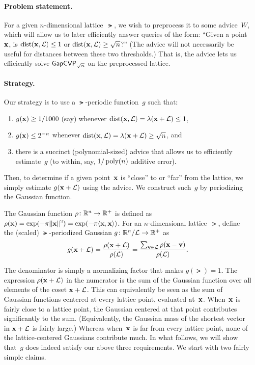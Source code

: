 \documentclass[11pt]{article}
\begin{document}
\paragraph{Problem statement.}

For a given $n$-dimensional lattice~$\lat$, we wish to preprocess it
to some advice~$W$, which will allow us to later efficiently answer
queries of the form: ``Given a point $\mathbf{x}$, is
$\operatorname{dist}(\mathbf{x},\mathcal{L}) \leq 1$ or $\operatorname{dist}(\mathbf{x},\mathcal{L}) \geq \sqrt{n}$?''
(The advice will not necessarily be useful for distances between these
two thresholds.) That is, the advice lets us efficiently solve
$\mathsf{GapCVP}_{\sqrt{n}}$ on the preprocessed lattice.

\paragraph{Strategy.}

Our strategy is to use a $\lat$-periodic function~$g$ such that:
\begin{enumerate}
\item $g(\mathbf{x}) \geq 1/1000$ (say) whenever
  $\operatorname{dist}(\mathbf{x},\mathcal{L}) = \lambda(\mathbf{x}+\mathcal{L}) \leq 1$,
\item $g(\mathbf{x}) \leq 2^{-n}$ whenever
  $\operatorname{dist}(\mathbf{x},\mathcal{L}) = \lambda(\mathbf{x}+\mathcal{L}) \geq \sqrt{n}$, and
\item there is a succinct (polynomial-sized) advice that allows us to
  efficiently estimate~$g$ (to within, say, $1/\operatorname{poly}(n)$ additive
  error).
\end{enumerate}
Then, to determine if a given point~$\mathbf{x}$ is ``close'' to or ``far''
from the lattice, we simply estimate $g(\mathbf{x}+\mathcal{L})$ using the advice.
We construct such~$g$ by periodizing the Gaussian function.

\begin{definition}
  \label{def:gaussian}
  The Gaussian function $\rho \colon \mathbb{R}^{n} \to \mathbb{R}^{+}$ is defined as
  $\rho(\mathbf{x}) = \exp(-\pi \lVert\mathbf{x}\rVert^2) = \exp(-\pi
  \langle\mathbf{x},\mathbf{x}\rangle)$. For an $n$-dimensional lattice~$\lat$, define
  the (scaled) $\lat$-periodized Gaussian
  $g \colon \mathbb{R}^{n}/\mathcal{L} \to \mathbb{R}^{+}$ as
  \begin{equation}
    \label{eq:g}
    g(\mathbf{x} + \mathcal{L}) = \frac{\rho(\mathbf{x}+\mathcal{L})}{\rho(\mathcal{L})} =
    \frac{\sum_{\mathbf{v} \in \mathcal{L}} \rho(\mathbf{x} - \mathbf{v})}{\rho(\mathcal{L})}.
  \end{equation}
\end{definition}

The denominator is simply a normalizing factor that makes
$g(\lat) = 1$. The expression $\rho(\mathbf{x}+\mathcal{L})$ in the numerator is
the sum of the Gaussian function over all elements of the coset
$\mathbf{x}+\mathcal{L}$. This can equivalently be seen as the sum of Gaussian
functions centered at every lattice point, evaluated at~$\mathbf{x}$.
When~$\mathbf{x}$ is fairly close to a lattice point, the Gaussian centered
at that point contributes significantly to the sum. (Equivalently, the
Gaussian mass of the shortest vector in $\mathbf{x}+\mathcal{L}$ is fairly large.)
Whereas when~$\mathbf{x}$ is far from every lattice point, none of the
lattice-centered Gaussians contribute much. In what follows, we will
show that~$g$ does indeed satisfy our above three requirements. We
start with two fairly simple claims.
\end{document}
